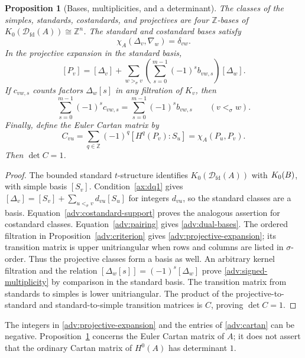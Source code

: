 \documentclass[11pt,a4paper]{article}
\newcommand{\defn}[1]{\textsl{\color{darkblue} #1}}
\newcommand{\D}{\mathcal D}
\newcommand{\ZZ}{\mathbb{Z}}
\newcommand{\std}{\Delta}
\newcommand{\costd}{\nabla}
\DeclareMathOperator{\fd}{fd}
\let\mod\relax
\DeclareMathOperator{\mod}{mod}
\theoremstyle{plain}
\newtheorem{proposition}[theorem]{Proposition}
\theoremstyle{definition}
\numberwithin{equation}{section}
\begin{document}
\begin{proposition}[Bases, multiplicities, and a determinant]
\label{adv:kzero}
The classes of the simples, standards, costandards, and projectives
are four $\ZZ$-bases of $K_0(\D_{\fd}(A))\cong\ZZ^n$.
The standard and costandard bases satisfy
\begin{equation}\label{adv:dual-bases}
 \chi_A(\std_v,\costd_w)=\delta_{vw}.
\end{equation}
In the projective expansion in the standard basis,
\begin{equation}\label{adv:projective-expansion}
 [P_v]=[\std_v]+\sum_{w>_\sigma v}
           \left(\sum_{s=0}^{m-1}(-1)^s b_{vw,s}\right)[\std_w].
\end{equation}
If $c_{vw,s}$ counts factors $\std_w[s]$ in any filtration of $K_v$,
then
\begin{equation}\label{adv:signed-multiplicity}
 \sum_{s=0}^{m-1}(-1)^s c_{vw,s}
 =\sum_{s=0}^{m-1}(-1)^s b_{vw,s}\qquad(v<_\sigma w).
\end{equation}
Finally, define the \defn{Euler Cartan matrix} by
\begin{equation}\label{adv:cartan}
 C_{vu}=\sum_{q\in\ZZ}(-1)^q[H^q(P_v):S_u]
       =\chi_A(P_u,P_v).
\end{equation}
Then $\det C=1$.
\end{proposition}
\begin{proof}
The bounded standard $t$-structure identifies
$K_0(\D_{\fd}(A))$ with $K_0(\mod B)$, with simple basis $[S_v]$.
Condition~\ref{ax:dq1} gives
$[\std_v]=[S_v]+\sum_{u<_\sigma v}d_{vu}[S_u]$ for integers
$d_{vu}$, so the standard classes are a basis.
Equation~\eqref{adv:costandard-support} proves the analogous assertion
for costandard classes. Equation~\eqref{adv:pairing} gives
\eqref{adv:dual-bases}.
The ordered filtration in Proposition~\ref{adv:criterion} gives
\eqref{adv:projective-expansion}; its transition matrix is upper
unitriangular when rows and columns are listed in $\sigma$-order.
Thus the projective classes form a basis as well.
An arbitrary kernel filtration and the relation
$[\std_w[s]]=(-1)^s[\std_w]$ prove
\eqref{adv:signed-multiplicity} by comparison in the standard basis.
The transition matrix from standards to simples is lower
unitriangular. The product of the projective-to-standard and
standard-to-simple transition matrices is $C$, proving $\det C=1$.
\end{proof}

The integers in \eqref{adv:projective-expansion} and the entries of
\eqref{adv:cartan} can be negative. Proposition~\ref{adv:kzero}
concerns the Euler Cartan matrix of $A$; it does not assert that the
ordinary Cartan matrix of $H^0(A)$ has determinant $1$.
\end{document}
